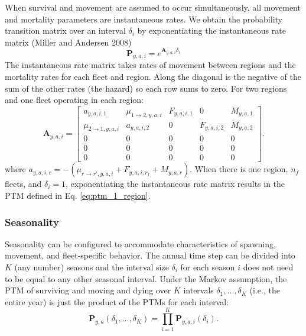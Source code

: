 \documentclass[
]{article}
\begin{document}
When survival and movement are assumed to occur simultaneously, all
movement and mortality parameters are instantaneous rates. We obtain the
probability transition matrix over an interval \(\delta_i\) by
exponentiating the instantaneous rate matrix (Miller and Andersen 2008)
\begin{equation*}
\mathbf{P}_{y,a,i} = e^{\mathbf{A}_{y,a,i}\delta_i}
\end{equation*} The instantaneous rate matrix takes rates of movement
between regions and the mortality rates for each fleet and region. Along
the diagonal is the negative of the sum of the other rates (the hazard)
so each row sums to zero. For two regions and one fleet operating in
each region: \begin{equation*}
 \mathbf{A}_{y,a,i} = \begin{bmatrix}
 a_{y,a,i,1} & \mu_{1\rightarrow 2,y,a,i} & F_{y,a,i,1} & 0 & M_{y,a,1} \\
 \mu_{2\rightarrow 1,y,a,i} &  a_{y,a,i,2} & 0 & F_{y,a,i,2} & M_{y,a,2} \\
 0 & 0 & 0 & 0 & 0 \\
 0 & 0 & 0 & 0 & 0 \\
 0 & 0 & 0 & 0 & 0
 \end{bmatrix}.
\end{equation*} where
\(a_{y,a,i,r} = -(\mu_{r\rightarrow r',y,a,i} + F_{y,a,i,r_f} + M_{y,a,r})\).
When there is one region, \(n_f\) fleets, and \(\delta_i = 1\),
exponentiating the instantaneous rate matrix results in the PTM defined
in Eq. \ref{eq:ptm_1_region}.

\hypertarget{seasonality}{%
\subsubsection*{Seasonality}\label{seasonality}}

Seasonality can be configured to accommodate characteristics of
spawning, movement, and fleet-specific behavior. The annual time step
can be divided into \(K\) (any number) seasons and the interval size
\(\delta_i\) for each season \(i\) does not need to be equal to any
other seasonal interval. Under the Markov assumption, the PTM of
surviving and moving and dying over \(K\) intervals
\(\delta_1,\ldots, \delta_K\) (i.e., the entire year) is just the
product of the PTMs for each interval:
\[ \mathbf{P}_{y,a}(\delta_1,\ldots,\delta_K) = \prod^K_{i=1}\mathbf{P}_{y,a,i}(\delta_i).\]
\end{document}
